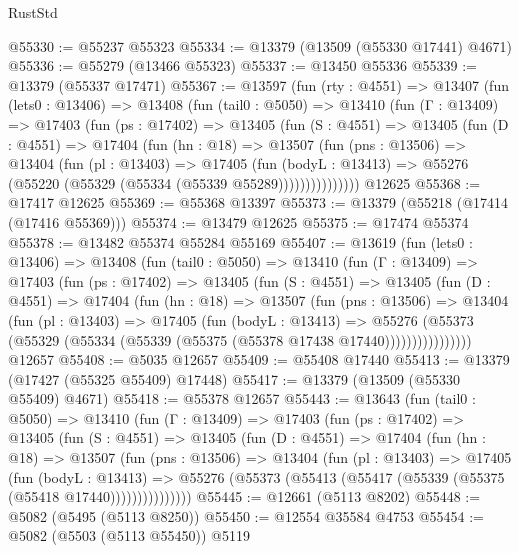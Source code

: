 \begin{lexlean}{RustStd}
\begin{coremodule}
@55330 := @55237 @55323
@55334 := @13379 (@13509 (@55330 @17441) @4671)
@55336 := @55279 (@13466 @55323)
@55337 := @13450 @55336
@55339 := @13379 (@55337 @17471)
@55367 := @13597
    (fun (rty : @4551) =>
    @13407
      (fun (lets0 : @13406) =>
      @13408
        (fun (tail0 : @5050) =>
        @13410
          (fun (Γ : @13409) =>
          @17403
            (fun (ps : @17402) =>
            @13405
              (fun (S : @4551) =>
              @13405
                (fun (D : @4551) =>
                @17404
                  (fun (hn : @18) =>
                  @13507
                    (fun (pns : @13506) =>
                    @13404
                      (fun (pl : @13403) =>
                      @17405
                        (fun (bodyL : @13413) =>
                        @55276 (@55220 (@55329 (@55334 (@55339 @55289)))))))))))))))
    @12625
@55368 := @17417 @12625
@55369 := @55368 @13397
@55373 := @13379 (@55218 (@17414 (@17416 @55369)))
@55374 := @13479 @12625
@55375 := @17474 @55374
@55378 := @13482 @55374 @55284 @55169
@55407 := @13619
    (fun (lets0 : @13406) =>
    @13408
      (fun (tail0 : @5050) =>
      @13410
        (fun (Γ : @13409) =>
        @17403
          (fun (ps : @17402) =>
          @13405
            (fun (S : @4551) =>
            @13405
              (fun (D : @4551) =>
              @17404
                (fun (hn : @18) =>
                @13507
                  (fun (pns : @13506) =>
                  @13404
                    (fun (pl : @13403) =>
                    @17405
                      (fun (bodyL : @13413) =>
                      @55276
                        (@55373
                          (@55329 (@55334 (@55339 (@55375 (@55378 @17438 @17440))))))))))))))))
    @12657
@55408 := @5035 @12657
@55409 := @55408 @17440
@55413 := @13379 (@17427 (@55325 @55409) @17448)
@55417 := @13379 (@13509 (@55330 @55409) @4671)
@55418 := @55378 @12657
@55443 := @13643
    (fun (tail0 : @5050) =>
    @13410
      (fun (Γ : @13409) =>
      @17403
        (fun (ps : @17402) =>
        @13405
          (fun (S : @4551) =>
          @13405
            (fun (D : @4551) =>
            @17404
              (fun (hn : @18) =>
              @13507
                (fun (pns : @13506) =>
                @13404
                  (fun (pl : @13403) =>
                  @17405
                    (fun (bodyL : @13413) =>
                    @55276 (@55373 (@55413 (@55417 (@55339 (@55375 (@55418 @17440)))))))))))))))
@55445 := @12661 (@5113 @8202)
@55448 := @5082 (@5495 (@5113 @8250))
@55450 := @12554 @35584 @4753
@55454 := @5082 (@5503 (@5113 @55450)) @5119

\end{coremodule}
\end{lexlean}
